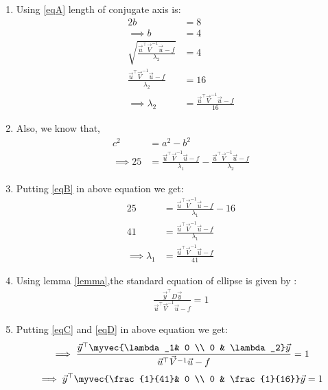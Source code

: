\documentclass[journal,12pt,twocolumn]{IEEEtran}
\begin{document}
\begin{enumerate}
\item Using \eqref{eqA} length of conjugate axis is:
\begin{align}
2b &= 8
\\
\implies b  &= 4
\\
 \sqrt{\frac{\vec{u}^{\top}\vec{V}^{-1}\vec{u}-f}{\lambda_2}} &= 4
\\
 \frac{\vec{u}^{\top}\vec{V}^{-1}\vec{u}-f}{\lambda_2} &= 16 \label{eqB}
\\
\implies \lambda_2&=\frac{\vec{u}^{\top}\vec{V}^{-1}\vec{u}-f}{16}\label{eqC} 
\end{align}
\item Also, we know that,
\begin{align}
 c^2 &=a^2-b^2    
\\
\implies 25 &= \frac{\vec{u}^{\top}\vec{V}^{-1}\vec{u}-f}{\lambda_1}-\frac{\vec{u}^{\top}\vec{V}^{-1}\vec{u}-f}{\lambda_2}
\end{align}
\item Putting \eqref{eqB} in above equation we get:
\begin{align}
    25 &= \frac{\vec{u}^{\top}\vec{V}^{-1}\vec{u}-f}{\lambda_1}-16
    \\
    41 &= \frac{\vec{u}^{\top}\vec{V}^{-1}\vec{u}-f}{\lambda_1}
    \\
     \implies\lambda_1&=\frac{\vec{u}^{\top}\vec{V}^{-1}\vec{u}-f}{41} \label{eqD}
\end{align}
\item Using lemma \eqref{lemma},the standard equation of ellipse is given by :
\begin{align}
\frac{\vec{y}^{\top}D\vec{y}}{\vec{u}^{\top}\vec{V}^{-1}\vec{u}-f}=1
\end{align}
\item Putting \eqref{eqC} and \eqref{eqD} in above equation we get:
\begin{align}
\implies \frac{\vec{y}^{\top}\myvec{\lambda_1& 0 \\ 0 & \lambda_2}\vec{y} }{\vec{u}^{\top}\vec{V}^{-1}\vec{u}-f}=1
\end{align}
\begin{align}
\implies \vec{y}^{\top}\myvec{\frac{1}{41}& 0 \\ 0 & \frac{1}{16}}\vec{y}=1
\end{align}


\end{enumerate}
\end{document}
